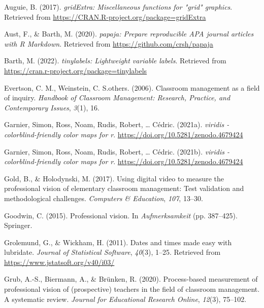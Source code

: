 \documentclass[
  man,floatsintext]{apa6}
\newlength{\cslhangindent}
\newlength{\cslentryspacingunit} %
\newenvironment{CSLReferences}[2] %
 {%
  \setlength{\parindent}{0pt}
  \ifodd #1
  \let\oldpar\par
  \def\par{\hangindent=\cslhangindent\oldpar}
  \fi
  \setlength{\parskip}{#2\cslentryspacingunit}
 }%
 {}
\begin{document}
\hypertarget{refs}{}
\begin{CSLReferences}{1}{0}
\leavevmode{}%
Auguie, B. (2017). \emph{gridExtra: Miscellaneous functions for "grid" graphics}. Retrieved from \url{https://CRAN.R-project.org/package=gridExtra}

\leavevmode{}%
Aust, F., \& Barth, M. (2020). \emph{{papaja}: {Prepare} reproducible {APA} journal articles with {R Markdown}}. Retrieved from \url{https://github.com/crsh/papaja}

\leavevmode{}%
Barth, M. (2022). \emph{{tinylabels}: Lightweight variable labels}. Retrieved from \url{https://cran.r-project.org/package=tinylabels}

\leavevmode{}%
Evertson, C. M., Weinstein, C. S.others. (2006). Classroom management as a field of inquiry. \emph{Handbook of Classroom Management: Research, Practice, and Contemporary Issues}, \emph{3}(1), 16.

\leavevmode{}%
Garnier, Simon, Ross, Noam, Rudis, Robert, \ldots{} Cédric. (2021a). \emph{{viridis} - colorblind-friendly color maps for r}. \url{https://doi.org/10.5281/zenodo.4679424}

\leavevmode{}%
Garnier, Simon, Ross, Noam, Rudis, Robert, \ldots{} Cédric. (2021b). \emph{{viridis} - colorblind-friendly color maps for r}. \url{https://doi.org/10.5281/zenodo.4679424}

\leavevmode{}%
Gold, B., \& Holodynski, M. (2017). Using digital video to measure the professional vision of elementary classroom management: Test validation and methodological challenges. \emph{Computers \& Education}, \emph{107}, 13--30.

\leavevmode{}%
Goodwin, C. (2015). Professional vision. In \emph{Aufmerksamkeit} (pp. 387--425). Springer.

\leavevmode{}%
Grolemund, G., \& Wickham, H. (2011). Dates and times made easy with {lubridate}. \emph{Journal of Statistical Software}, \emph{40}(3), 1--25. Retrieved from \url{https://www.jstatsoft.org/v40/i03/}

\leavevmode{}%
Grub, A.-S., Biermann, A., \& Brünken, R. (2020). Process-based measurement of professional vision of (prospective) teachers in the field of classroom management. A systematic review. \emph{Journal for Educational Research Online}, \emph{12}(3), 75--102.


\end{CSLReferences}
\end{document}
